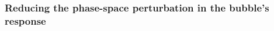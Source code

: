 

\subsubsection{Reducing the phase-space perturbation in the bubble's response}\label{sec:reducing_perturbation}



